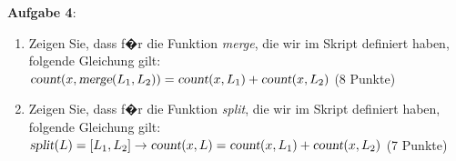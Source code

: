 \documentclass{article}
\begin{document}
\vspace{0.3cm}

\noindent
\textbf{Aufgabe 4}:
\begin{enumerate}
\item Zeigen Sie, dass f�r die Funktion \textsl{merge}, die wir im Skript definiert haben,
      folgende Gleichung gilt:
      \\
      \hspace*{1.3cm}
      $\textsl{count}(x, \textsl{merge}(L_1, L_2)) = \textsl{count}(x, L_1) + \textsl{count}(x, L_2)$
      \hspace*{\fill} (8 Punkte)
\item Zeigen Sie, dass f�r die Funktion \textsl{split}, die wir im Skript definiert haben,
      folgende Gleichung gilt:
      \\
      \hspace*{1.3cm}
      $\textsl{split}(L) = [L_1, L_2] \rightarrow \textsl{count}(x, L) = \textsl{count}(x, L_1) + \textsl{count}(x, L_2)$
      \hspace*{\fill} (7 Punkte)
\end{enumerate}
\end{document}

